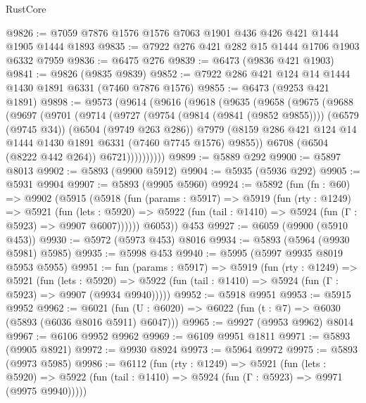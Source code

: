 \begin{lexlean}{RustCore}
\begin{coremodule}
@9826 := @7059 @7876 @1576 @1576 @7063 @1901 @436 @426 @421 @1444 @1905 @1444 @1893
@9835 := @7922 @276 @421 @282 @15 @1444 @1706 @1903 @6332 @7959
@9836 := @6475 @276
@9839 := @6473 (@9836 @421 @1903)
@9841 := @9826 (@9835 @9839)
@9852 := @7922 @286 @421 @124 @14 @1444 @1430 @1891 @6331 (@7460 @7876 @1576)
@9855 := @6473 (@9253 @421 @1891)
@9898 := @9573
    (@9614
      (@9616
        (@9618
          (@9635
            (@9658
              (@9675
                (@9688
                  (@9697
                    (@9701
                      (@9714
                        (@9727
                          (@9754 (@9814 (@9841 (@9852 @9855))))
                          (@6579 (@9745 @34))
                          (@6504 (@9749 @263 @286))
                          @7979
                          (@8159
                            @286
                            @421
                            @124
                            @14
                            @1444
                            @1430
                            @1891
                            @6331
                            (@7460 @7745 @1576)
                            @9855))
                        @6708
                        (@6504 (@8222 @442 @264))
                        @6721))))))))))
@9899 := @5889 @292
@9900 := @5897 @8013
@9902 := @5893 (@9900 @5912)
@9904 := @5935 (@5936 @292)
@9905 := @5931 @9904
@9907 := @5893 (@9905 @5960)
@9924 := @5892
    (fun (fn : @60) =>
    @9902
      (@5915
        (@5918
          (fun (params : @5917) =>
          @5919
            (fun (rty : @1249) =>
            @5921
              (fun (lets : @5920) =>
              @5922 (fun (tail : @1410) => @5924 (fun (Γ : @5923) => @9907 @6007))))))
        @6053))
    @453
@9927 := @6059 (@9900 (@5910 @453))
@9930 := @5972 (@5973 @453) @8016
@9934 := @5893 (@5964 (@9930 @5981) @5985)
@9935 := @5998 @453
@9940 := @5995 (@5997 @9935 @8019 @5953 @5955)
@9951 := fun (params : @5917) =>
  @5919
    (fun (rty : @1249) =>
    @5921
      (fun (lets : @5920) =>
      @5922 (fun (tail : @1410) => @5924 (fun (Γ : @5923) => @9907 (@9934 @9940)))))
@9952 := @5918 @9951
@9953 := @5915 @9952
@9962 := @6021 (fun (U : @6020) => @6022 (fun (t : @7) => @6030 (@5893 (@6036 @8016 @5911) @6047)))
@9965 := @9927 (@9953 @9962) @8014
@9967 := @6106 @9952 @9962
@9969 := @6109 @9951 @1811
@9971 := @5893 (@9905 @8921)
@9972 := @9930 @8924
@9973 := @5964 @9972
@9975 := @5893 (@9973 @5985)
@9986 := @6112
    (fun (rty : @1249) =>
    @5921
      (fun (lets : @5920) =>
      @5922 (fun (tail : @1410) => @5924 (fun (Γ : @5923) => @9971 (@9975 @9940)))))

\end{coremodule}
\end{lexlean}
